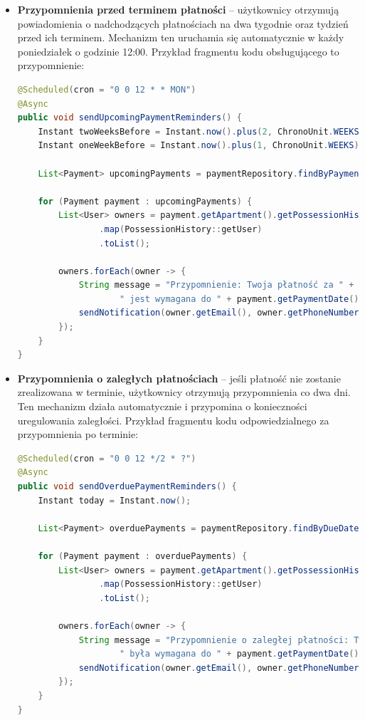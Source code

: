 \begin{itemize}
    \item \textbf{Przypomnienia przed terminem płatności} -- użytkownicy otrzymują powiadomienia o nadchodzących płatnościach na dwa tygodnie oraz tydzień przed ich terminem. Mechanizm ten uruchamia się automatycznie w każdy poniedziałek o godzinie 12:00. Przykład fragmentu kodu obsługującego to przypomnienie:

\begin{lstlisting}[language=Java, caption=Przypomnienie o nadchodzących płatnościach]
@Scheduled(cron = "0 0 12 * * MON")
@Async
public void sendUpcomingPaymentReminders() {
    Instant twoWeeksBefore = Instant.now().plus(2, ChronoUnit.WEEKS);
    Instant oneWeekBefore = Instant.now().plus(1, ChronoUnit.WEEKS);

    List<Payment> upcomingPayments = paymentRepository.findByPaymentDateBetween(twoWeeksBefore, oneWeekBefore);

    for (Payment payment : upcomingPayments) {
        List<User> owners = payment.getApartment().getPossessionHistories().stream()
                .map(PossessionHistory::getUser)
                .toList();

        owners.forEach(owner -> {
            String message = "Przypomnienie: Twoja płatność za " + payment.getDescription() +
                    " jest wymagana do " + payment.getPaymentDate() + ".";
            sendNotification(owner.getEmail(), owner.getPhoneNumber(), message);
        });
    }
}
\end{lstlisting}

    \item \textbf{Przypomnienia o zaległych płatnościach} -- jeśli płatność nie zostanie zrealizowana w terminie, użytkownicy otrzymują przypomnienia co dwa dni. Ten mechanizm działa automatycznie i przypomina o konieczności uregulowania zaległości. Przykład fragmentu kodu odpowiedzialnego za przypomnienia po terminie:

\begin{lstlisting}[language=Java, caption=Przypomnienie o zaległych płatnościach]
@Scheduled(cron = "0 0 12 */2 * ?")
@Async
public void sendOverduePaymentReminders() {
    Instant today = Instant.now();

    List<Payment> overduePayments = paymentRepository.findByDueDateBeforeAndIsPaidFalse(today);

    for (Payment payment : overduePayments) {
        List<User> owners = payment.getApartment().getPossessionHistories().stream()
                .map(PossessionHistory::getUser)
                .toList();

        owners.forEach(owner -> {
            String message = "Przypomnienie o zaległej płatności: Twoja płatność za " + payment.getDescription() +
                    " była wymagana do " + payment.getPaymentDate() + ". Prosimy o dokonanie płatności jak najszybciej.";
            sendNotification(owner.getEmail(), owner.getPhoneNumber(), message);
        });
    }
}
\end{lstlisting}
\end{itemize}

